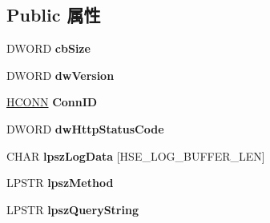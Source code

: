 \subsection*{Public 属性}
\begin{DoxyCompactItemize}
\item 
\mbox{\label{struct___e_x_t_e_n_s_i_o_n___c_o_n_t_r_o_l___b_l_o_c_k_aceefc545a69946f476821818a4803ef5}} 
D\+W\+O\+RD {\bfseries cb\+Size}
\item 
\mbox{\label{struct___e_x_t_e_n_s_i_o_n___c_o_n_t_r_o_l___b_l_o_c_k_a0ed9326ceb6eaa04482af128946dad3b}} 
D\+W\+O\+RD {\bfseries dw\+Version}
\item 
\mbox{\label{struct___e_x_t_e_n_s_i_o_n___c_o_n_t_r_o_l___b_l_o_c_k_ab9fe3e35680e8d27767c05be750e59d7}} 
\hyperlink{interfacevoid}{H\+C\+O\+NN} {\bfseries Conn\+ID}
\item 
\mbox{\label{struct___e_x_t_e_n_s_i_o_n___c_o_n_t_r_o_l___b_l_o_c_k_a139debfef367124a19bce681a81ae36b}} 
D\+W\+O\+RD {\bfseries dw\+Http\+Status\+Code}
\item 
\mbox{\label{struct___e_x_t_e_n_s_i_o_n___c_o_n_t_r_o_l___b_l_o_c_k_a6211cf274a4060ce336c09f2450bd70e}} 
C\+H\+AR {\bfseries lpsz\+Log\+Data} \mbox{[}H\+S\+E\+\_\+\+L\+O\+G\+\_\+\+B\+U\+F\+F\+E\+R\+\_\+\+L\+EN\mbox{]}
\item 
\mbox{\label{struct___e_x_t_e_n_s_i_o_n___c_o_n_t_r_o_l___b_l_o_c_k_a3cbe27b34a5ab3a3d2889dcc40e0f31f}} 
L\+P\+S\+TR {\bfseries lpsz\+Method}
\item 
\mbox{\label{struct___e_x_t_e_n_s_i_o_n___c_o_n_t_r_o_l___b_l_o_c_k_ab09eca0edeb9e24a0428f186cac6dc89}} 
L\+P\+S\+TR {\bfseries lpsz\+Query\+String}
\item 
\mbox{\label{struct___e_x_t_e_n_s_i_o_n___c_o_n_t_r_o_l___b_l_o_c_k_ae059fc8fdb5eebf04081e663e80b889d}} 

\end{DoxyCompactItemize}
